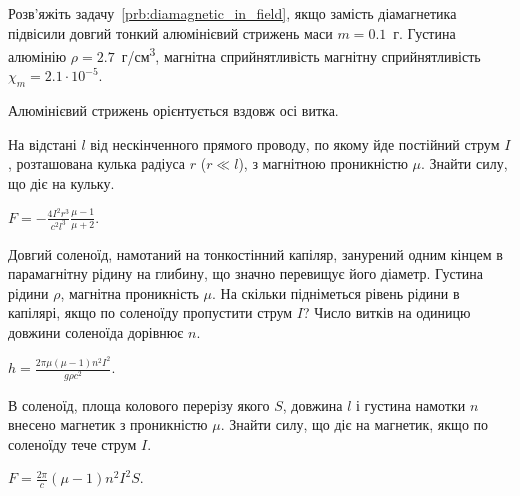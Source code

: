 \begin{problem}\label{prb:diamagnetic_in_field}
    Розв'яжіть задачу~\ref{prb:diamagnetic_in_field}, якщо замість діамагнетика підвісили довгий тонкий алюмінієвий стрижень маси $m = 0.1$~г. Густина алюмінію $\rho = 2.7$~г/см\textsuperscript{3}, магнітна сприйнятливість магнітну сприйнятливість $\chi_m = 2.1\cdot 10^{-5}$.
\begin{solution}
	Алюмінієвий стрижень орієнтується вздовж осі витка.
\end{solution}
\end{problem}

\begin{problem}
На відстані $l$ від нескінченного прямого проводу, по якому
йде постійний струм $I$, розташована кулька радіуса
$r$ ($r \ll l$), з магнітною проникністю $\mu$. Знайти силу, що діє
на кульку.
\begin{solution}
	$F = - \frac{4I^2r^3}{c^2l^3}\frac{\mu - 1}{\mu + 2}$.
\end{solution}
\end{problem}

\begin{problem}
Довгий соленоїд, намотаний на тонкостінний капіляр, занурений одним кінцем в парамагнітну рідину на глибину, що значно перевищує його діаметр. Густина рідини $\rho$, магнітна проникність $\mu$. На скільки підніметься рівень рідини в капілярі, якщо по соленоїду пропустити струм $I$? Число витків на одиницю довжини соленоїда дорівнює $n$.
\begin{solution}
	$h = \frac{2\pi\mu(\mu - 1)n^2 I^2}{g\rho c^2}$.
\end{solution}
\end{problem}




\begin{problem} %
В соленоїд, площа колового перерізу якого $S$, довжина $l$ і густина намотки $n$ внесено магнетик з проникністю $\mu$. Знайти силу, що діє на магнетик, якщо по соленоїду тече струм $I$.
\begin{solution}
	$F = \frac{2\pi}{c} (\mu - 1) n^2 I^2S$.
\end{solution}
\end{problem}

